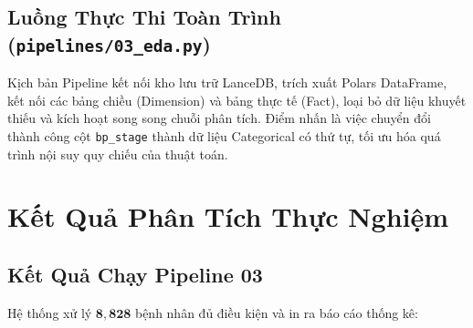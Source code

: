 \documentclass[11pt, a4paper]{article}
\begin{document}
\subsection{Luồng Thực Thi Toàn Trình (\texttt{pipelines/03\_eda.py})}
Kịch bản Pipeline kết nối kho lưu trữ LanceDB, trích xuất Polars DataFrame, kết nối các bảng chiều (Dimension) và bảng thực tế (Fact), loại bỏ dữ liệu khuyết thiếu và kích hoạt song song chuỗi phân tích. Điểm nhấn là việc chuyển đổi thành công cột \texttt{bp\_stage} thành dữ liệu Categorical có thứ tự, tối ưu hóa quá trình nội suy quy chiếu của thuật toán.

\section{Kết Quả Phân Tích Thực Nghiệm}

\subsection{Kết Quả Chạy Pipeline 03}
Hệ thống xử lý $\mathbf{8{,}828}$ bệnh nhân đủ điều kiện và in ra báo cáo thống kê:
\end{document}
